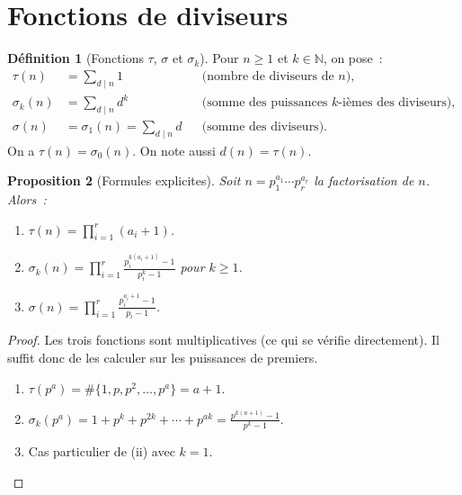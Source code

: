 \documentclass[12pt,a4paper,openany]{book}
\theoremstyle{definition}
\newtheorem{definition}{Définition}[chapter]
\theoremstyle{plain}
\newtheorem{proposition}[definition]{Proposition}
\theoremstyle{remark}
\newcommand{\N}{\mathbb{N}}
\begin{document}
\section{Fonctions de diviseurs}
\label{sec:fonctions-diviseurs}

\begin{definition}[Fonctions $\tau$, $\sigma$ et $\sigma_k$]
\label{def:tau-sigma}
Pour $n \geq 1$ et $k \in \N$, on pose~:
\begin{align*}
  \tau(n) &= \sum_{d \mid n} 1 &&\text{(nombre de diviseurs de $n$),} \\
  \sigma_k(n) &= \sum_{d \mid n} d^k &&\text{(somme des puissances $k$-ièmes des diviseurs),} \\
  \sigma(n) &= \sigma_1(n) = \sum_{d \mid n} d &&\text{(somme des diviseurs).}
\end{align*}
On a $\tau(n) = \sigma_0(n)$. On note aussi $d(n) = \tau(n)$.
\end{definition}

\begin{proposition}[Formules explicites]
\label{prop:formules-tau-sigma}
Soit $n = p_1^{a_1} \cdots p_r^{a_r}$ la factorisation de $n$. Alors~:
\begin{enumerate}[label=(\roman*)]
  \item $\tau(n) = \displaystyle\prod_{i=1}^{r} (a_i + 1)$.
  \item $\sigma_k(n) = \displaystyle\prod_{i=1}^{r} \frac{p_i^{k(a_i+1)} - 1}{p_i^k - 1}$
    pour $k \geq 1$.
  \item $\sigma(n) = \displaystyle\prod_{i=1}^{r} \frac{p_i^{a_i+1} - 1}{p_i - 1}$.
\end{enumerate}
\end{proposition}

\begin{proof}
Les trois fonctions sont multiplicatives (ce qui se vérifie directement). Il suffit donc
de les calculer sur les puissances de premiers.
\begin{enumerate}[label=(\roman*)]
  \item $\tau(p^a) = \#\{1, p, p^2, \ldots, p^a\} = a + 1$.
  \item $\sigma_k(p^a) = 1 + p^k + p^{2k} + \cdots + p^{ak}
    = \frac{p^{k(a+1)} - 1}{p^k - 1}$.
  \item Cas particulier de (ii) avec $k = 1$. \qedhere
\end{enumerate}
\end{proof}
\end{document}
